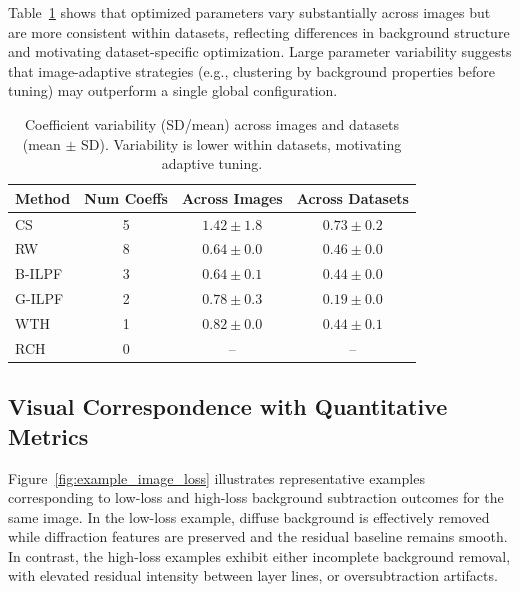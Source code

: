\documentclass[11pt,onecolumn]{IEEEtran}
\begin{document}
Table~\ref{tab:summary_total_variability} shows that optimized parameters vary substantially across images but are more consistent within datasets, reflecting differences in background structure and motivating dataset-specific optimization.
Large parameter variability suggests that image-adaptive strategies (e.g., clustering by background properties before tuning) may outperform a single global configuration.

\begin{table}[t]
\centering
\small
\caption{Coefficient variability (SD/mean) across images and datasets (mean $\pm$ SD). Variability is lower within datasets, motivating adaptive tuning.}
\label{tab:summary_total_variability}
\begin{tabular}{@{}lccc@{}}
\toprule
Method & Num Coeffs & Across Images & Across Datasets \\
\midrule
CS & 5 & $1.42 \pm 1.8$ & $0.73 \pm 0.2$ \\
RW & 8 & $0.64 \pm 0.0$ & $0.46 \pm 0.0$ \\
B-ILPF & 3 & $0.64 \pm 0.1$ & $0.44 \pm 0.0$ \\
G-ILPF & 2 & $0.78 \pm 0.3$ & $0.19 \pm 0.0$ \\
WTH & 1 & $0.82 \pm 0.0$ & $0.44 \pm 0.1$ \\
RCH & 0 & -- & -- \\
\bottomrule
\end{tabular}
\end{table}


\subsection{Visual Correspondence with Quantitative Metrics}

Figure~\ref{fig:example_image_loss} illustrates representative examples corresponding to low-loss and high-loss background subtraction outcomes for the same image. In the low-loss example, diffuse background is effectively removed while diffraction features are preserved and the residual baseline remains smooth. In contrast, the high-loss examples exhibit either incomplete background removal, with elevated residual intensity between layer lines, or oversubtraction artifacts. 
\end{document}
